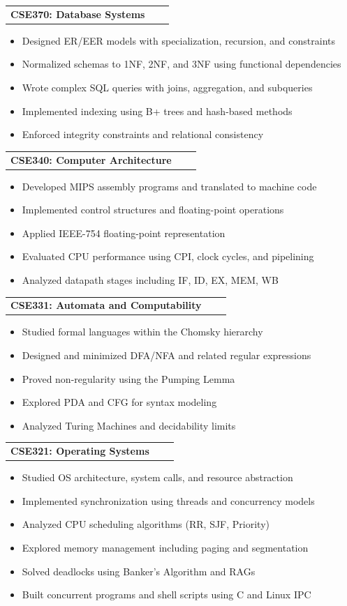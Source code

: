 \documentclass[a4paper,12pt]{article}
\makeatletter
\newenvironment{joblong}[2]
    {
    \begin{tabularx}{\linewidth}{@{}l X r@{}}
    \textbf{#1} & \hfill &  #2 \\[3.75pt]
    \end{tabularx}
    \begin{minipage}[t]{\linewidth}
    \begin{itemize}[nosep,after=\strut, leftmargin=1em, itemsep=3pt,label=--]
    }
    {
    \end{itemize}
    \end{minipage}    
    }
\makeatother
\begin{document}
\begin{joblong}{CSE370: Database Systems}{}
\item Designed ER/EER models with specialization, recursion, and constraints
\item Normalized schemas to 1NF, 2NF, and 3NF using functional dependencies
\item Wrote complex SQL queries with joins, aggregation, and subqueries
\item Implemented indexing using B+ trees and hash-based methods
\item Enforced integrity constraints and relational consistency
\end{joblong}

\begin{joblong}{CSE340: Computer Architecture}{}
\item Developed MIPS assembly programs and translated to machine code
\item Implemented control structures and floating-point operations
\item Applied IEEE-754 floating-point representation
\item Evaluated CPU performance using CPI, clock cycles, and pipelining
\item Analyzed datapath stages including IF, ID, EX, MEM, WB
\end{joblong}

\begin{joblong}{CSE331: Automata and Computability}{}
\item Studied formal languages within the Chomsky hierarchy
\item Designed and minimized DFA/NFA and related regular expressions
\item Proved non-regularity using the Pumping Lemma
\item Explored PDA and CFG for syntax modeling
\item Analyzed Turing Machines and decidability limits
\end{joblong}

\begin{joblong}{CSE321: Operating Systems}{}
\item Studied OS architecture, system calls, and resource abstraction
\item Implemented synchronization using threads and concurrency models
\item Analyzed CPU scheduling algorithms (RR, SJF, Priority)
\item Explored memory management including paging and segmentation
\item Solved deadlocks using Banker’s Algorithm and RAGs
\item Built concurrent programs and shell scripts using C and Linux IPC
\end{joblong}
\end{document}
